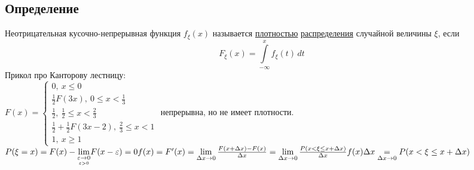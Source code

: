 \documentclass[12pt, a4paper]{article}
\begin{document}
    \subsection*{Определение}
    Неотрицательная кусочно-непрерывная функция $f_{\xi}(x)$ называется \underline{плотностью} \underline{распределения} случайной величины $\xi$, если
    \[F_{\xi}(x) = \int\limits_{-\infty}^{x} f_{\xi}(t)\, dt\]
    Прикол про Канторову лестницу:\\
    $F(x) = \begin{cases}
        0,\ x\leq 0\\
        \frac{1}{2}F(3x),\ 0\leq x < \frac{1}{3}\\
        \frac{1}{2},\ \frac{1}{2} \leq x < \frac{2}{3}\\
        \frac{1}{2} + \frac{1}{2}F(3x - 2),\ \frac{2}{3} \leq x < 1\\
        1,\ x\geq 1
    \end{cases}$ непрерывна, но не имеет плотности.\\
    $P(\xi = x) = F(x) - \underset{\underset{\varepsilon > 0}{\varepsilon \to 0}}{\lim} F(x - \varepsilon) = 0\\
    f(x) = F'(x) = \lim\limits_{\Delta x \to 0} \frac{F(x + \Delta x) - F(x)}{\Delta x} = \lim\limits_{\Delta x\to 0} \frac{P(x < \xi \leq x + \Delta x)}{\Delta x}\\
    f(x)\Delta x \underset{\Delta x \to 0}{=} P(x < \xi \leq x + \Delta x)$
\end{document}

